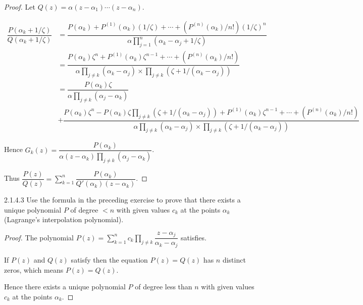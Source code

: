 \begin{proof}
	Let \( Q(z) = \alpha(z - \alpha_{1}) \cdots (z - \alpha_{n}) \).

	\begingroup
	\allowdisplaybreaks%
	\begin{align*}
		\dfrac{P(\alpha_{k} + 1/\zeta)}{Q(\alpha_{k} + 1/\zeta)} & = \dfrac{P(\alpha_{k}) + P^{(1)}(\alpha_{k})(1/\zeta) + \cdots + (P^{(n)}(\alpha_{k})/n!){(1/\zeta)}^{n}}{\alpha \prod^{n}_{j=1}(\alpha_{k} - \alpha_{j} + 1/\zeta)}                                                                                                                      \\
		                                                         & = \dfrac{P(\alpha_{k})\zeta^{n} + P^{(1)}(\alpha_{k})\zeta^{n-1} + \cdots + (P^{(n)}(\alpha_{k})/n!)}{\alpha \prod_{j\ne k}(\alpha_{k} - \alpha_{j}) \times \prod_{j\ne k}(\zeta + 1/(\alpha_{k} - \alpha_{j}))}                                                                          \\
		                                                         & = \dfrac{P(\alpha_{k})\zeta}{\alpha\prod_{j\ne k}(\alpha_{j} - \alpha_{k})}                                                                                                                                                                                                               \\
		                                                         & + \dfrac{P(\alpha_{k})\zeta^{n} - P(\alpha_{k})\zeta \prod_{j\ne k}(\zeta + 1/(\alpha_{k} - \alpha_{j})) + P^{(1)}(\alpha_{k})\zeta^{n-1} + \cdots + (P^{(n)}(\alpha_{k})/n!)}{\alpha \prod_{j\ne k}(\alpha_{k} - \alpha_{j}) \times \prod_{j\ne k}(\zeta + 1/(\alpha_{k} - \alpha_{j}))}
	\end{align*}
	\endgroup

	Hence \( G_{k}(z) = \dfrac{P(\alpha_{k})}{\alpha (z - \alpha_{k}) \prod_{j\ne k}(\alpha_{j} - \alpha_{k})} \).

	Thus \( \dfrac{P(z)}{Q(z)} = \displaystyle\sum_{k=1}^{n} \dfrac{P(\alpha_{k})}{Q'(\alpha_{k})(z - \alpha_{k})} \).
\end{proof}

\begin{problem}{2.1.4.3}
Use the formula in the preceding exercise to prove that there exists a unique polynomial \( P \) of degree \( < n \) with given values \( c_{k} \) at the points \( \alpha_{k} \) (Lagrange's interpolation polynomial).
\end{problem}

\begin{proof}
	The polynomial \( P(z) = \displaystyle\sum_{k=1}^{n} c_{k}\prod_{j\ne k}\dfrac{z - \alpha_{j}}{\alpha_{k} - \alpha_{j}} \) satisfies.

	If \( P(z) \) and \( Q(z) \) satisfy then the equation \( P(z) = Q(z) \) has \( n \) distinct zeros, which means \( P(z) = Q(z) \).

	Hence there exists a unique polynomial \( P \) of degree less than \( n \) with given values \( c_{k} \) at the points \( \alpha_{k} \).
\end{proof}

